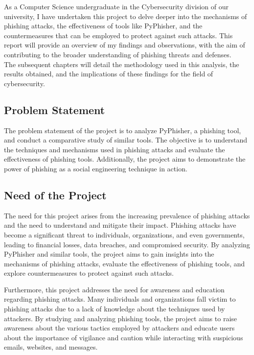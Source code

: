 \documentclass[openany]{report}
\begin{document}
As a Computer Science undergraduate in the Cybersecurity division of our university, I have undertaken this project to delve deeper into the mechanisms of phishing attacks, the effectiveness of tools like PyPhisher, and the countermeasures that can be employed to protect against such attacks. This report will provide an overview of my findings and observations, with the aim of contributing to the broader understanding of phishing threats and defenses.\\

The subsequent chapters will detail the methodology used in this analysis, the results obtained, and the implications of these findings for the field of cybersecurity.


\subsection{Problem Statement}
The problem statement of the project is to analyze PyPhisher, a phishing tool, and conduct a comparative study of similar tools. The objective is to understand the techniques and mechanisms used in phishing attacks and evaluate the effectiveness of phishing tools. Additionally, the project aims to demonstrate the power of phishing as a social engineering technique in action.

\subsection{Need of the Project}
The need for this project arises from the increasing prevalence of phishing attacks and the need to understand and mitigate their impact. Phishing attacks have become a significant threat to individuals, organizations, and even governments, leading to financial losses, data breaches, and compromised security. By analyzing PyPhisher and similar tools, the project aims to gain insights into the mechanisms of phishing attacks, evaluate the effectiveness of phishing tools, and explore countermeasures to protect against such attacks.

Furthermore, this project addresses the need for awareness and education regarding phishing attacks. Many individuals and organizations fall victim to phishing attacks due to a lack of knowledge about the techniques used by attackers. By studying and analyzing phishing tools, the project aims to raise awareness about the various tactics employed by attackers and educate users about the importance of vigilance and caution while interacting with suspicious emails, websites, and messages.\\
\end{document}

